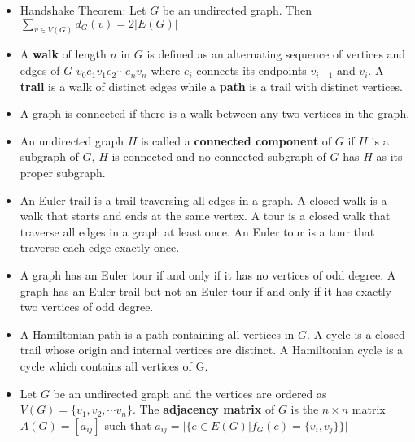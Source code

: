 \documentclass[11pt, twocolumn]{article}
\newenvironment{compactitem}
{\begin{itemize}
  \setlength{\itemsep}{1px}
  \setlength{\parskip}{0pt}
  \setlength{\parsep}{0pt}}
{\end{itemize}}
\begin{document}
\begin{compactitem}
\item Handshake Theorem: Let $G$ be an undirected graph. Then $\sum_{v\in V(G)} d_G(v) = 2|E(G)|$
\item A \textbf{walk} of length $n$ in $G$ is defined as an alternating sequence of vertices and edges of $G$ $v_0e_1v_1e_2\cdots e_n v_n$ where $e_i$ connects its endpoints $v_{i-1}$ and $v_{i}$. A \textbf{trail} is a walk of distinct edges while a \textbf{path} is a trail with distinct vertices.
\item A graph is connected if there is a walk between any two vertices in the graph.
\item An undirected graph $H$ is called a \textbf{connected component} of $G$ if $H$ is a subgraph of $G$, $H$ is connected and no connected subgraph of $G$ has $H$ as its proper subgraph.
\item An Euler trail is a trail traversing all edges in a graph. A closed walk is a walk that starts and ends at the same vertex. A tour is a closed walk that traverse all edges in a graph at least once. An Euler tour is a tour that traverse each edge exactly once.
\item A graph has an Euler tour if and only if it has no vertices of odd degree. A graph has an Euler trail but not an Euler tour if and only if it has exactly two vertices of odd degree.
\item A Hamiltonian path is a path containing all vertices in $G$. A cycle is a closed trail whose origin and internal vertices are distinct. A Hamiltonian cycle is a cycle which contains all vertices of G.
\item Let $G$ be an undirected graph and the vertices are ordered as $V(G) = \{v_1, v_2, \cdots v_n\}$. The \textbf{adjacency matrix} of $G$ is the $n\times n$ matrix $A(G) = [a_{ij}]$ such that $a_{ij} = |\{e\in E(G) | f_G(e) = \{v_i, v_j\}\}|$
\end{compactitem}
\end{document}

